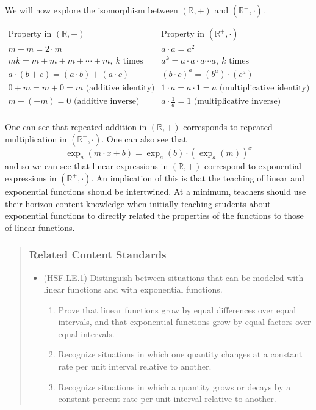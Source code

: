 \documentclass[
]{book}
\providecommand{\tightlist}{%
  \setlength{\itemsep}{0pt}\setlength{\parskip}{0pt}}
\theoremstyle{definition}
\theoremstyle{definition}
\theoremstyle{definition}
\theoremstyle{remark}
\begin{document}
We will now explore the isomorphism between \((\mathbb{R},+)\) and \((\mathbb{R}^+,\cdot)\).

\[\begin{array}{c|c}
\mbox{Property in } (\mathbb{R},+) & \mbox{Property in } (\mathbb{R}^+,\cdot) \\ \hline
 m+m=2\cdot m & a\cdot a = a^2 \\ 
mk=m+m+m+\cdots +m, \: k \mbox{ times} & a^k=a \cdot a \cdot a\cdots a, \: k \mbox{ times} \\ 
a\cdot (b+c) = (a\cdot b) + (a\cdot c) & (b\cdot c)^a = (b^a) \cdot (c^a) \\ 
0+m=m+0=m  \mbox{ (additive identity)} & 1\cdot a=a\cdot 1= a  \mbox{ (multiplicative identity)} \\ 
m+(-m)=0 \mbox{ (additive inverse)} & a\cdot \frac{1}{a}=1 \mbox{ (multiplicative inverse)} \\ 
\end{array}\]

One can see that repeated addition in \((\mathbb{R},+)\) corresponds to repeated multiplication in \((\mathbb{R}^+,\cdot)\). One can also see that \[\exp_a\left( m\cdot x + b\right) = \exp_a(b) \cdot \left(\exp_a(m)\right)^x\] and so we can see that linear expressions in \((\mathbb{R},+)\) correspond to exponential expressions in \((\mathbb{R}^+,\cdot)\). An implication of this is that the teaching of linear and exponential functions should be intertwined. At a minimum, teachers should use their horizon content knowledge when initially teaching students about exponential functions to directly related the properties of the functions to those of linear functions.

\begin{quote}
\hypertarget{related-content-standards-24}{%
\subsubsection*{Related Content Standards}\label{related-content-standards-24}}

\begin{itemize}
\tightlist
\item
  (HSF.LE.1) Distinguish between situations that can be modeled with linear functions and with exponential functions.

  \begin{enumerate}
  \def\labelenumi{\alph{enumi}.}
  \tightlist
  \item
    Prove that linear functions grow by equal differences over equal intervals, and that exponential functions grow by equal factors over equal intervals.
  \item
    Recognize situations in which one quantity changes at a constant rate per unit interval relative to another.
  \item
    Recognize situations in which a quantity grows or decays by a constant percent rate per unit interval relative to another.
  \end{enumerate}
\end{itemize}
\end{quote}
\end{document}
